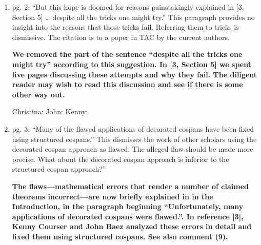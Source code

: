 \documentclass[reqno]{amsart}
\def\chris{\color{purple} Christina: }
\def\john{\color{red} John: }
\def\kenny{\color{blue} Kenny: }
\begin{document}
\begin{enumerate}
{\john I've improved the reference and added a citation to it.  Is this okay now?}

{\chris Yes!}
\fi


\item pg. 2: ``But this hope is doomed for reasons painstakingly explained in [3, Section 5] … despite all the tricks one might try.'' This paragraph 
provides 
no insight into the reasons that those tricks fail. Referring them to tricks is dismissive. The citation is to a paper in TAC by the current authors.

{\bf We removed the part of the sentence ``despite all the tricks one might try'' according to this suggestion. In [3, Section 5] we spent five pages discussing these attempts and why they fail.    The diligent reader may wish to read this discussion and see if there is some other way out.}

{\chris \checkmark} {\john \checkmark} {\kenny \checkmark}

\iffalse
{\john He thought we were being dismissive because he didn't know that the ``tricks'' were all things I'd done myself!  If he looked at [1, Section 5] 
he'd see it was me coming up with a bunch of tricks to try to save the decorated cospan category of open graphs, and then Kenny and me explaining why 
this tricks don't work.  So maybe I should just delete ``despite all the tricks one might try''.  Sound good?}

{\chris Sounds good to me! See above, amend at will.}

{\kenny Sounds good.}
\fi

\item pg. 3: ``Many of the flawed applications of decorated cospans have been fixed using structured cospans.” This dismisses the work of other 
scholars 
using the decorated cospan approach as flawed. The alleged flaw should be made more precise. What about the decorated cospan approach is inferior to 
the structured cospan approach?''

{\bf  The flaws---mathematical errors that render a number of claimed theorems incorrect---are now briefly explained in  in the Introduction, in the paragraph beginning ``Unfortunately, many applications of decorated cospans were flawed.''.  In reference [3], Kenny Courser and John Baez analyzed these errors in detail and fixed them using structured cospans.  See also comment (9).}


\end{enumerate}
\end{document}
